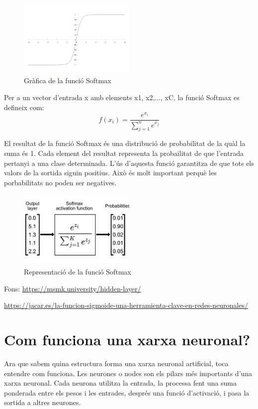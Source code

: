 \begin{enumerate}
\begin{figure}[h!]
    \centering
    \includegraphics[width=0.5\textwidth]{./figures/Softmax.png}
    \caption{Gràfica de la funció Softmax}
\end{figure}

Per a un vector d'entrada x amb elements x1, x2,..., xC, la funció Softmax es defineix com:
\[f(x_i) = \frac{e^{x_i}}{\sum_{j=1}^{n} e^{x_j}}\]

El resultat de la funció Softmax és una distribució de probabilitat de la quàl la suma és 1. Cada element del resultat representa la probailitat de que l'entrada pertanyi a una clase determinada. L'ús d'aquesta funció garantitza de que tots els valors de la sortida siguin positius. Això és molt important perquè les porbabilitats no poden ser negatives.

\begin{figure}[H]
    \centering
    \includegraphics[width=0.5\textwidth]{./figures/representacio_Softmax.png}
    \caption{Representació de la funció Softmax}
\end{figure}

Fons: \href{https://msmk.university/hidden-layer/}{https://msmk.university/hidden-layer/}


\href{https://jacar.es/la-funcion-sigmoide-una-herramienta-clave-en-redes-neuronales/}{https://jacar.es/la-funcion-sigmoide-una-herramienta-clave-en-redes-neuronales/}

\end{enumerate}

\section{Com funciona una xarxa neuronal?}\label{sec:3.8}
Ara que sabem quina estructura forma una xarxa neuronal artificial, toca entendre com funciona. Les neurones o nodes son els pilars més importants d'una xarxa neuronal. Cada neurona utilitza la entrada, la processa fent una suma ponderada entre els pesos i les entrades, després una funció d'activació, i pasa la sortida a altres neurones.\\

